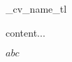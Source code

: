 \documentclass[letterpaper, 11pt]{article}
\begin{document}

\ExplSyntaxOn
\begin{minipage}{0.6\linewidth}
\par {\huge \g_cv_name_tl}
\end{minipage}%
\begin{minipage}{0.4\linewidth}
content...
\end{minipage}
\ExplSyntaxOff

$abc$

\DTMNow
\end{document}
